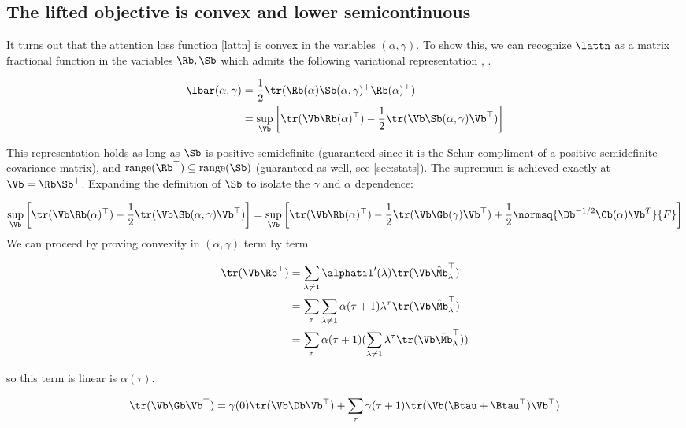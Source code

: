 \documentclass{article}
\begin{document}
\subsection{The lifted objective is convex and lower semicontinuous}
It turns out that the attention loss function \eqref{lattn} is convex in the variables $(\alpha, \gamma)$. To show this, we can recognize $\lattn$ as a matrix fractional function in the variables $\Rb, \Sb$ which admits the following variational representation \cite{burke2015matrix}, \cite{boyd2004convex}. 

\begin{align}
    \lbar(\alpha, \gamma) &= \frac{1}{2}\tr(\Rb(\alpha)\Sb(\alpha, \gamma)^+\Rb(\alpha)^\top)\\
    &= \sup_{\Vb}\left[ \tr(\Vb\Rb(\alpha)^\top) - \frac{1}{2}\tr(\Vb\Sb(\alpha, \gamma)\Vb^\top)\right]\label{lattn_var}
\end{align}

This representation holds as long as $\Sb$ is positive semidefinite (guaranteed since it is the Schur compliment of a positive semidefinite covariance matrix), and $\text{range}(\Rb^\top) \subseteq \text{range}(\Sb)$ (guaranteed as well, see \ref{sec:stats}). The supremum is achieved exactly at $\Vb = \Rb \Sb^+$. Expanding the definition of $\Sb$ to isolate the $\gamma$ and $\alpha$ dependence: 

\begin{equation}
     \sup_{\Vb}\left[ \tr(\Vb\Rb(\alpha)^\top) - \frac{1}{2}\tr(\Vb\Sb(\alpha, \gamma)\Vb^\top)\right] = \sup_{\Vb}\left[ \tr(\Vb\Rb(\alpha)^\top) - \frac{1}{2}\tr(\Vb\Gb(\gamma)\Vb^\top) + \frac{1}{2} \normsq{\Db^{-1/2}\Cb(\alpha) \Vb^T}{F}\right]
\end{equation}
We can proceed by proving convexity in $(\alpha, \gamma)$ term by term. 

\begin{align}
    \tr(\Vb\Rb^\top) &= \sum_{\lambda\neq 1} \alphatil'(\lambda)\tr(\Vb\hat{\Mb}^\top_\lambda)\\
    &= \sum_\tau\sum_{\lambda\neq1} \alpha(\tau+1)\lambda^\tau\tr(\Vb\hat{\Mb}^\top_\lambda)\\
    &= \sum_\tau\alpha({\tau+1})(\sum_{\lambda\neq1} \lambda^\tau\tr(\Vb\hat{\Mb}^\top_\lambda))
\end{align}

so this term is linear is $\alpha(\tau)$. 

\begin{equation}
    \tr(\Vb\Gb\Vb^\top) = \gamma(0)\tr(\Vb\Db\Vb^\top) + \sum_{\tau}\gamma(\tau+1)\tr(\Vb(\Btau + \Btau^\top)\Vb^\top)
\end{equation}
\end{document}
